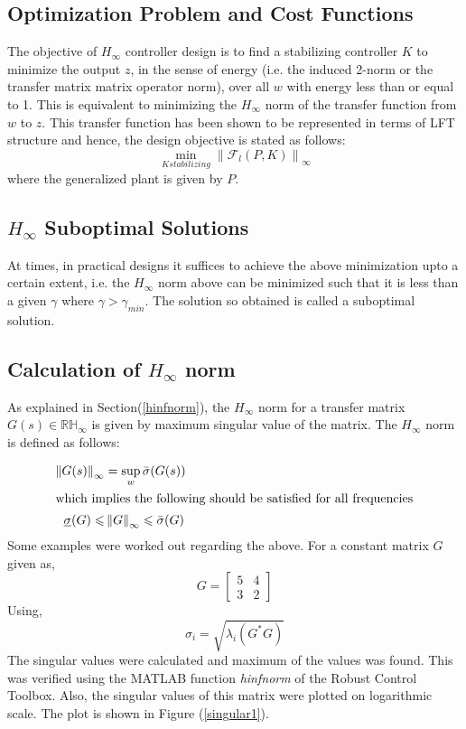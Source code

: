 \documentclass[a4paper,12pt]{article}
\newcommand\norm[1]{\left\lVert#1\right\rVert}
\begin{document}
			\subsection{Optimization Problem and Cost Functions} The objective of $H_{\infty}$ controller design is to find a stabilizing controller $K$ to minimize the output $z$, in the sense of energy (i.e. the induced 2-norm or the transfer matrix matrix operator norm), over all $w$ with energy less than or equal to 1. This is equivalent to minimizing the $H_{\infty}$ norm of the transfer function from $w$ to $z$. This transfer function has been shown to be represented in terms of LFT structure and hence, the design objective is stated as follows:
			\begin{equation}
				\min_{K stabilizing} \norm{\mathscr{F}_{l}(P,K)}_{\infty}
			\end{equation}
			where the generalized plant is given by $P$. 
			\subsection{$H_{\infty}$ Suboptimal Solutions} At times, in practical designs it suffices to achieve the above minimization upto a certain extent, i.e. the $H_{\infty}$ norm above can be minimized such that it is less than a given $\gamma$ where $\gamma > \gamma_{min}$. The solution so obtained is called a suboptimal solution. 
			\subsection{Calculation of $H_{\infty}$ norm} As explained in Section(\ref{hinfnorm}), the $H_{\infty}$ norm for a transfer matrix $G(s) \in \mathbb{RH}_{\infty}$ is given by maximum singular value of the matrix. The $H_{\infty}$ norm is defined as follows:
			
			\begin{align}
				\norm{G(s)}_{\infty} &= \sup_{w}\bar{\sigma}(G(s))\\
				\intertext{which implies the following should be satisfied for all frequencies}
				 \underline{\sigma}(G) \leqslant &\norm{G}_{\infty} \leqslant \bar{\sigma}(G)
			\end{align}
		Some examples were worked out regarding the above. For a constant matrix $G$ given as, 
		\[G=
		\begin{bmatrix}
		5 &4\\3 & 2
		\end{bmatrix}
		\]
		Using, \begin{equation}
		\sigma_{i}=\sqrt{\lambda_{i}(G^{*}G)}
		\end{equation}
		The singular values were calculated and maximum of the values was found. This was verified using the MATLAB function \emph{hinfnorm} of the Robust Control Toolbox. Also, the singular values of this matrix were plotted on logarithmic scale. The plot is shown in Figure (\ref{singular1}).
		
\end{document}
